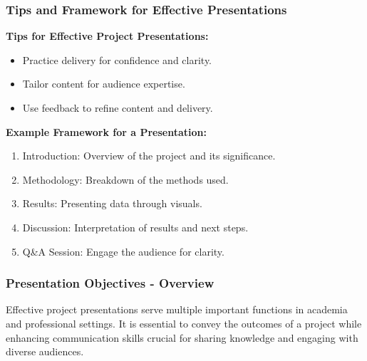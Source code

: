 \documentclass[aspectratio=169]{beamer}
\begin{document}
\begin{frame}[fragile]
    \frametitle{Tips and Framework for Effective Presentations}
    \textbf{Tips for Effective Project Presentations:}
    \begin{itemize}
        \item Practice delivery for confidence and clarity.
        \item Tailor content for audience expertise.
        \item Use feedback to refine content and delivery.
    \end{itemize}

    \textbf{Example Framework for a Presentation:}
    \begin{enumerate}
        \item Introduction: Overview of the project and its significance.
        \item Methodology: Breakdown of the methods used.
        \item Results: Presenting data through visuals.
        \item Discussion: Interpretation of results and next steps.
        \item Q\&A Session: Engage the audience for clarity.
    \end{enumerate}
\end{frame}

\begin{frame}[fragile]
    \frametitle{Presentation Objectives - Overview}
    Effective project presentations serve multiple important functions in academia and professional settings. 
    It is essential to convey the outcomes of a project while enhancing communication skills crucial for sharing knowledge and engaging with diverse audiences.
\end{frame}
\end{document}
